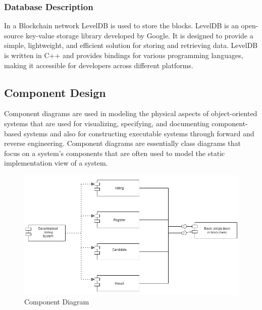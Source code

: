 \documentclass[oneside, 12pt]{book}
\begin{document}
			\subsubsection{Database Description}
				In a Blockchain network LevelDB is used to store the blocks. LevelDB is an open-source key-value storage library developed by Google. It is designed to provide a simple, lightweight, and efficient solution for storing and retrieving data. LevelDB is written in C++ and provides bindings for various programming languages, making it accessible for developers across different platforms.
		\subsection{Component Design}
			Component diagrams are used in modeling the physical aspects of object-oriented systems that are used for visualizing, specifying, and documenting component- based systems and also for constructing executable systems through forward and reverse engineering. Component diagrams are essentially class diagrams that focus on a system’s components that are often used to model the static implementation view of a system.
			\begin{figure}[H]
				\centering
				\includegraphics[width=\linewidth]{./Resources/component.png}
			    \caption{Component Diagram}
			    \label{fig:component}
			\end{figure}
\end{document}
